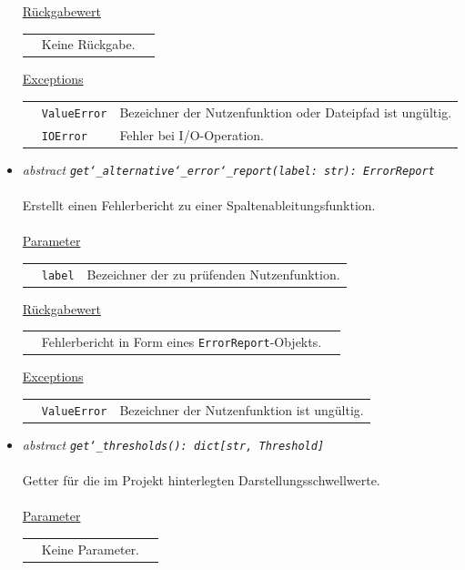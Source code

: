 \documentclass{article}
\begin{document}
\begin{itemize}
\underline{Rückgabewert}\\
\begin{tabular}{lll}
 & Keine Rückgabe.\\
\end{tabular}

\underline{Exceptions}\\
\begin{tabular}{lll}
 & \texttt{ValueError} & Bezeichner der Nutzenfunktion oder Dateipfad ist ungültig.\\
 & \texttt{IOError} & Fehler bei I/O-Operation.\\
\end{tabular}


\item \textit{\flqq{}abstract\frqq} \texttt{\textit{get\char`_alternative\char`_error\char`_report(label: str): ErrorReport}}\\\\
Erstellt einen Fehlerbericht zu einer Spaltenableitungsfunktion.
\\\\
\underline{Parameter}\\
\begin{tabular}{lll}
 & \texttt{label} & Bezeichner der zu prüfenden Nutzenfunktion.\\
\end{tabular}

\underline{Rückgabewert}\\
\begin{tabular}{lll}
 & Fehlerbericht in Form eines \texttt{ErrorReport}-Objekts.\\
\end{tabular}

\underline{Exceptions}\\
\begin{tabular}{lll}
 & \texttt{ValueError} & Bezeichner der Nutzenfunktion ist ungültig.\\
\end{tabular}


\item \textit{\flqq{}abstract\frqq} \texttt{\textit{get\char`_thresholds(): dict[str, Threshold]}}\\\\
Getter für die im Projekt hinterlegten Darstellungsschwellwerte.
\\\\
\underline{Parameter}\\
\begin{tabular}{lll}
 & Keine Parameter.\\
\end{tabular}


\end{itemize}
\end{document}
